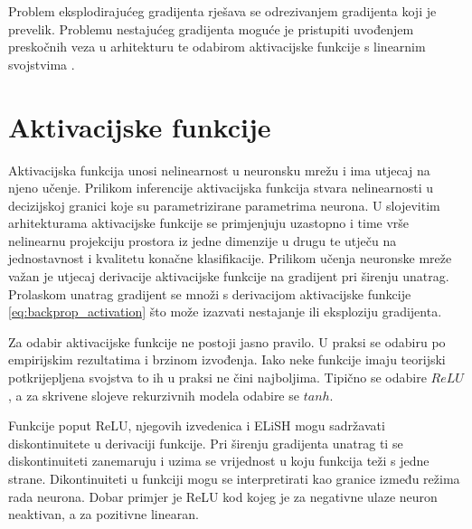 \documentclass[times, utf8, numeric, diplomski]{fer}
\def\TODO#1{\noindent\textcolor{red}{TODO: \textit{#1}}\newline}
\def\todo#1{\TODO{#1}}
\begin{document}
Problem eksplodirajućeg gradijenta rješava se odrezivanjem gradijenta koji je prevelik. Problemu nestajućeg gradijenta moguće je pristupiti uvođenjem preskočnih veza u arhitekturu \citep{highwaynet,resnet,densenet} te odabirom aktivacijske funkcije s linearnim svojstvima \citep{elish}.

%

\chapter{Aktivacijske funkcije}
\label{sec:aktivacijske_fje}
Aktivacijska funkcija unosi nelinearnost u neuronsku mrežu i ima utjecaj na njeno učenje. Prilikom inferencije aktivacijska funkcija stvara nelinearnosti u decizijskoj granici koje su parametrizirane parametrima neurona. U slojevitim arhitekturama aktivacijske funkcije se primjenjuju uzastopno i time vrše nelinearnu projekciju prostora iz jedne dimenzije u drugu te utječu na jednostavnost i kvalitetu konačne klasifikacije. Prilikom učenja neuronske mreže važan je utjecaj derivacije aktivacijske funkcije na gradijent pri širenju unatrag. Prolaskom unatrag gradijent se množi s derivacijom aktivacijske funkcije \eqref{eq:backprop_activation} što može izazvati nestajanje ili eksploziju gradijenta.

Za odabir aktivacijske funkcije ne postoji jasno pravilo. U praksi se odabiru po empirijskim rezultatima i brzinom izvođenja. Iako neke funkcije imaju teorijski potkrijepljena svojstva to ih u praksi ne čini najboljima. Tipično se odabire $ReLU$, a za skrivene slojeve rekurzivnih modela odabire se $tanh$.

Funkcije poput ReLU, njegovih izvedenica i ELiSH mogu sadržavati diskontinuitete u derivaciji funkcije. Pri širenju gradijenta unatrag ti se diskontinuiteti zanemaruju i uzima se vrijednost u koju funkcija teži s jedne strane. Dikontinuiteti u funkciji mogu se interpretirati kao granice između režima rada neurona. Dobar primjer je ReLU kod kojeg je za negativne ulaze neuron neaktivan, a za pozitivne linearan.
\end{document}
